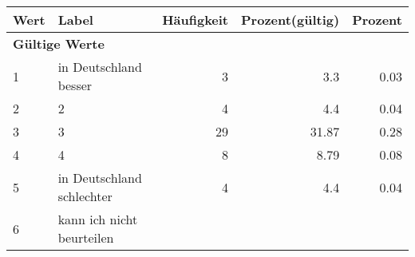      \begin{longtable}{lXrrr}
     \toprule
     \textbf{Wert} & \textbf{Label} & \textbf{Häufigkeit} & \textbf{Prozent(gültig)} & \textbf{Prozent} \\
     \endhead
     \midrule
     \multicolumn{5}{l}{\textbf{Gültige Werte}}\\

     1 &
     \multicolumn{1}{X}{ in Deutschland besser   } &


       \num{3} &
       \num[round-mode=places,round-precision=2]{3.3} &
         \num[round-mode=places,round-precision=2]{0.03} \\

     2 &
     \multicolumn{1}{X}{ 2   } &


       \num{4} &
       \num[round-mode=places,round-precision=2]{4.4} &
         \num[round-mode=places,round-precision=2]{0.04} \\

     3 &
     \multicolumn{1}{X}{ 3   } &


       \num{29} &
       \num[round-mode=places,round-precision=2]{31.87} &
         \num[round-mode=places,round-precision=2]{0.28} \\

     4 &
     \multicolumn{1}{X}{ 4   } &


       \num{8} &
       \num[round-mode=places,round-precision=2]{8.79} &
         \num[round-mode=places,round-precision=2]{0.08} \\

     5 &
     \multicolumn{1}{X}{ in Deutschland schlechter   } &


       \num{4} &
       \num[round-mode=places,round-precision=2]{4.4} &
         \num[round-mode=places,round-precision=2]{0.04} \\

     6 &
     \multicolumn{1}{X}{ kann ich nicht beurteilen   } &



\end{longtable}
